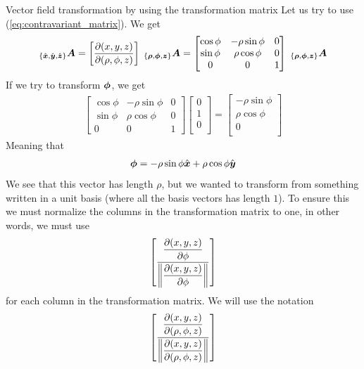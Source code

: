 \documentclass[a4paper, 12pt]{article}
\begin{document}
\begin{example}{Vector field transformation by using the transformation matrix}
 Let us try to use (\ref{eq:contravariant_matrix}). We get
 \begin{align*}
  _{\{\hat{\boldsymbol{x}}, \hat{\boldsymbol{y}}, \hat{\boldsymbol{z}}\}} \boldsymbol{A}
   =
   \left[\frac{\partial {(x, y, z)}}{\partial{(\rho, \phi, z)}}\right] \;
    _{\{\boldsymbol{\rho}, \boldsymbol{\phi},\boldsymbol{z}\}}\boldsymbol{A}
   = \begin{bmatrix} \cos\phi & -\rho\sin\phi & 0 \\
                     \sin\phi &  \rho\cos\phi & 0 \\
                     0 & 0 & 1
  \end{bmatrix} \;
  _{\{\boldsymbol{\rho}, \boldsymbol{\phi},\boldsymbol{z}\}}\boldsymbol{A}
 \end{align*}
 If we try to transform $\boldsymbol{\phi}$, we get
 \begin{align*} 
   \begin{bmatrix} \cos\phi & -\rho\sin\phi & 0 \\
                     \sin\phi &  \rho\cos\phi & 0 \\
                     0 & 0 & 1
  \end{bmatrix}
  \begin{bmatrix} 0 \\
 		 1 \\
 		 0 \\
  \end{bmatrix}
  =
  \begin{bmatrix} -\rho\sin\phi \\
 		 \rho\cos\phi \\
 		 0 \\
  \end{bmatrix}
 \end{align*}
 Meaning that 
 \begin{align*}
  \boldsymbol{\phi} = -\rho\sin\phi \hat{\boldsymbol{x}} + \rho\cos\phi \hat{\boldsymbol{y}}
 \end{align*}
 We see that this vector has length $\rho$, but we wanted to transform from 
 something written in a unit basis (where all the basis vectors has length 
$1$). 
 To ensure this we must normalize the columns in the transformation matrix to 
 one, in other words, we must use
 \begin{align*}
   \left[
      \frac{\displaystyle \frac{\partial {(x, y, z)}}{\partial{\phi}}}{
            \displaystyle \left\|\frac{\partial {(x,y, z)}}{\partial{\phi}}\right\| } \right]
 \end{align*}
 for each column in the transformation matrix. We will use the notation
 \begin{align*}
   \L[
      \frac{\displaystyle \parti{(x, y, z)}{(\rho, \phi, z)}}{
            \displaystyle \L\|\parti{(x,y, z)}{(\rho, \phi, z)}\R\| } \R]

\end{align*}
\end{example}
\end{document}
